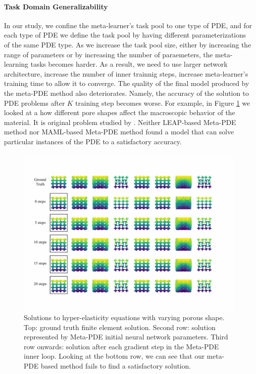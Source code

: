 \paragraph{Task Domain Generalizability} In our study, we confine the meta-learner's task pool to one type of PDE, and for each type of PDE we define the task pool by having different parameterizations of the same PDE type. As we increase the task pool size, either by increasing the range of parameters or by increasing the number of paraemeters, the meta-learning tasks becomes harder. As a result, we need to use larger network architecture, increase the number of inner trainnig steps, increase meta-learner's training time to allow it to converge. The quality of the final model produced by the meta-PDE method also deteriorates. Namely, the accuracy of the solution to PDE problems after $K$ training step becomes worse. For example, in Figure \ref{fig:elasticity_flower_meta} we looked at a how different pore shapes affect the macroscopic behavior of the material. It is original problem studied by \citet{overvelde2014relating}. Neither LEAP-based Meta-PDE method nor MAML-based Meta-PDE method found a model that can solve particular instances of the PDE to a satisfactory accuracy. \\
\begin{figure}
  \centering
\includegraphics[width=0.6\linewidth]{figures/hyper_elasticity_circle_meta.pdf}
\caption{\small Solutions to hyper-elasticity equations with varying porous shape. Top: ground truth finite element solution. Second row: solution represented by Meta-PDE initial neural network parameters. Third row onwards: solution after each gradient step in the Meta-PDE inner loop. Looking at the bottom row, we can see that our meta-PDE based method fails to find a satisfactory solution. }%
\label{fig:elasticity_flower_meta}%
\end{figure}

